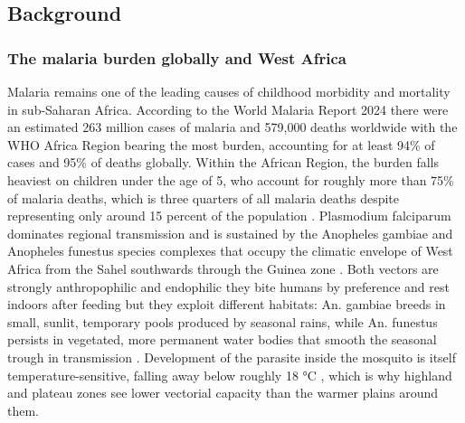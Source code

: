 \documentclass{article}
\begin{document}
\subsection{Background}\label{background}

\subsubsection{The malaria burden globally and West
Africa}\label{the-malaria-burden-globally-and-west-africa}

Malaria remains one of the leading causes of childhood morbidity and
mortality in sub-Saharan Africa. According to the World Malaria Report
2024 \citep{who2024malaria} there were an estimated 263 million cases of
malaria and 579,000 deaths worldwide with the WHO Africa Region bearing
the most burden, accounting for at least 94\% of cases and 95\% of
deaths globally. Within the African Region, the burden falls heaviest on
children under the age of 5, who account for roughly more than 75\% of
malaria deaths, which is three quarters of all malaria deaths despite
representing only around 15 percent of the population
\citep{who2024malaria}. Plasmodium falciparum dominates regional
transmission and is sustained by the Anopheles gambiae and Anopheles
funestus species complexes that occupy the climatic envelope of West
Africa from the Sahel southwards through the Guinea zone
\citep{bhatt2015, weiss2020}. Both vectors are strongly anthropophilic
and endophilic they bite humans by preference and rest indoors after
feeding but they exploit different habitats: An. gambiae breeds in
small, sunlit, temporary pools produced by seasonal rains, while An.
funestus persists in vegetated, more permanent water bodies that smooth
the seasonal trough in transmission \citep{sinka2010dominant}.
Development of the parasite inside the mosquito is itself
temperature-sensitive, falling away below roughly 18 °C
\citep{gething2011modelling}, which is why highland and plateau zones
see lower vectorial capacity than the warmer plains around them.
\end{document}
